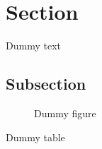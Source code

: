 \documentclass{article}
\begin{document}
\tableofcontents
\newpage

\section{Section}

Dummy text

\subsection{Subsection}

\begin{figure}[h]
  \caption{Dummy figure}
\end{figure}

\begin{table}[h]
  \caption{Dummy table}
\end{table}

\newpage

\begin{appendix}
  \listoffigures
  \listoftables
\end{appendix}
\end{document}
